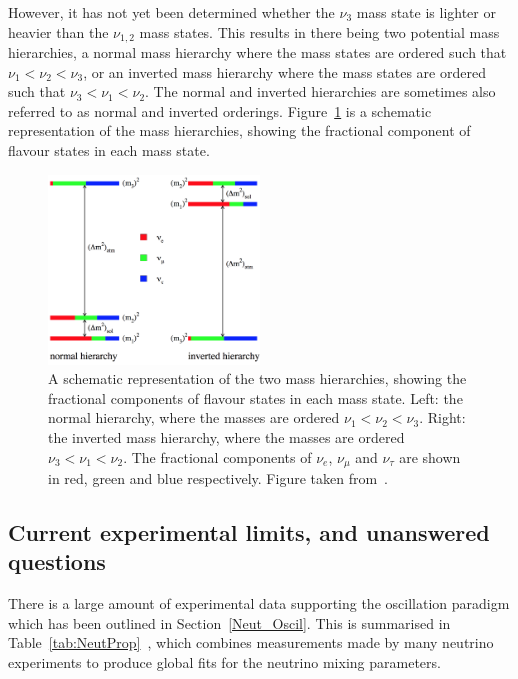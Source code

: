 However, it has not yet been determined whether the $\nu_{3}$ mass state is lighter or heavier than the $\nu_{1,2}$ mass states. This results in there being two potential mass hierarchies, a normal mass hierarchy where the mass states are ordered such that $\nu_{{1}} < \nu_{{2}} < \nu_{{3}}$, or an inverted mass hierarchy where the mass states are ordered such that $\nu_{{3}} < \nu_{{1}} < \nu_{{2}}$. The normal and inverted hierarchies are sometimes also referred to as normal and inverted orderings. Figure~\ref{fig:Neut_MH} is a schematic representation of the mass hierarchies, showing the fractional component of flavour states in each mass state. \\
\begin{figure}
  \centering
  \includegraphics[width=0.5\textwidth]{MassHierarchy}
  \caption[A schematic representation of the two mass hierarchies, showing the fractional components of flavour states in each mass state]
          {A schematic representation of the two mass hierarchies, showing the fractional components of flavour states in each mass state. Left: the normal hierarchy, where the masses are ordered $\nu_{{1}} < \nu_{{2}} < \nu_{{3}}$. Right: the inverted mass hierarchy, where the masses are ordered $\nu_{{3}} < \nu_{{1}} < \nu_{{2}}$. The fractional components of $\nu_{e}$, $\nu_{\mu}$ and $\nu_{\tau}$ are shown in red, green and blue respectively. Figure taken from~\citep{Hewett:2012ns}.}
  \label{fig:Neut_MH}
\end{figure}

\subsection{Current experimental limits, and unanswered questions} \label{sec:Theory_Exp}
There is a large amount of experimental data supporting the oscillation paradigm which has been outlined in Section~\ref{Neut_Oscil}. This is summarised in Table~\ref{tab:NeutProp}~\citep{NuFit2016}, which combines measurements made by many neutrino experiments to produce global fits for the neutrino mixing parameters. \\ 

